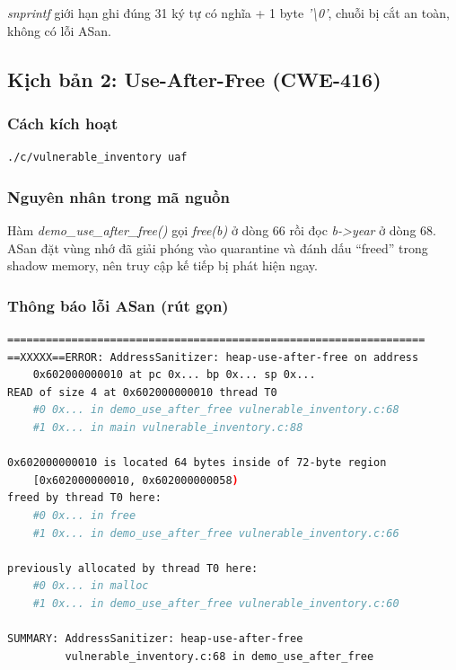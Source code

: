 \textit{snprintf} giới hạn ghi đúng 31 ký tự có nghĩa + 1 byte \textit{'\textbackslash0'},
chuỗi bị cắt an toàn, không có lỗi ASan.

\subsection{Kịch bản 2: Use-After-Free (CWE-416)}

\subsubsection{Cách kích hoạt}

\begin{lstlisting}[language=bash, caption={Kích hoạt use-after-free}]
./c/vulnerable_inventory uaf
\end{lstlisting}

\subsubsection{Nguyên nhân trong mã nguồn}

Hàm \textit{demo\_use\_after\_free()} gọi \textit{free(b)} ở dòng 66 rồi đọc
\textit{b->year} ở dòng 68. ASan đặt vùng nhớ đã giải phóng vào quarantine và
đánh dấu ``freed'' trong shadow memory, nên truy cập kế tiếp bị phát hiện ngay.

\subsubsection{Thông báo lỗi ASan (rút gọn)}

\begin{lstlisting}[language=bash, caption={ASan output -- heap-use-after-free}]
=================================================================
==XXXXX==ERROR: AddressSanitizer: heap-use-after-free on address
    0x602000000010 at pc 0x... bp 0x... sp 0x...
READ of size 4 at 0x602000000010 thread T0
    #0 0x... in demo_use_after_free vulnerable_inventory.c:68
    #1 0x... in main vulnerable_inventory.c:88

0x602000000010 is located 64 bytes inside of 72-byte region
    [0x602000000010, 0x602000000058)
freed by thread T0 here:
    #0 0x... in free
    #1 0x... in demo_use_after_free vulnerable_inventory.c:66

previously allocated by thread T0 here:
    #0 0x... in malloc
    #1 0x... in demo_use_after_free vulnerable_inventory.c:60

SUMMARY: AddressSanitizer: heap-use-after-free
         vulnerable_inventory.c:68 in demo_use_after_free
\end{lstlisting}

